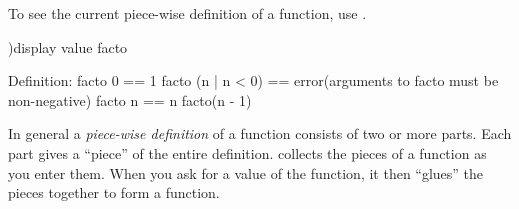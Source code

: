 \begin{xtc}
\begin{xtccomment}
To see the current piece-wise definition of a function,
use .
\end{xtccomment}
\begin{spadsrc}
)display value facto 
\end{spadsrc}
\begin{SysCmdOutput}
   Definition:
     facto 0 == 1
     facto (n | n < 0) == error(arguments to facto must be non-negative)
     facto n == n facto(n - 1)
\end{SysCmdOutput}
\end{xtc}

In general a {\it piece-wise definition} of a function consists of two or
more parts.
Each part gives a ``piece'' of the entire definition.
\Language{} collects the pieces of a function as you enter them.
When you ask for a value of the function, it then ``glues''
the pieces together to form a function.

